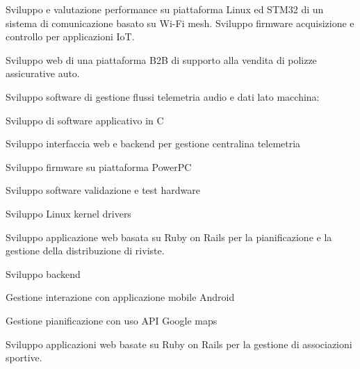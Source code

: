 \documentclass[]{deedy-resume-openfont}
\begin{document}
\begin{minipage}[t]{0.90\textwidth}

Sviluppo e valutazione performance su piattaforma Linux ed STM32 di un sistema di comunicazione basato su Wi-Fi mesh.
Sviluppo firmware acquisizione e controllo per applicazioni IoT.
\vspace{\topsep} %


Sviluppo web di una piattaforma B2B di supporto alla vendita di polizze assicurative auto.
\vspace{\topsep} %


Sviluppo software di gestione flussi telemetria audio e dati lato macchina:
\vspace{\topsep} %
\begin{tightemize}
\item Sviluppo di software applicativo in C
\item Sviluppo interfaccia web e backend per gestione centralina telemetria
\item Sviluppo firmware su piattaforma PowerPC
\item Sviluppo software validazione e test hardware
\item Sviluppo Linux kernel drivers
\end{tightemize}
\vspace*{4mm}

Sviluppo applicazione web basata su Ruby on Rails per la pianificazione e la gestione della distribuzione di riviste.
\vspace{\topsep} %
\begin{tightemize}
\item Sviluppo backend
\item Gestione interazione con applicazione mobile Android
\item Gestione pianificazione con uso API Google maps
\end{tightemize}
\vspace*{4mm}

Sviluppo applicazioni web basate su Ruby on Rails per la gestione di associazioni sportive.
\vspace*{4mm}
\end{minipage}
\end{document}
